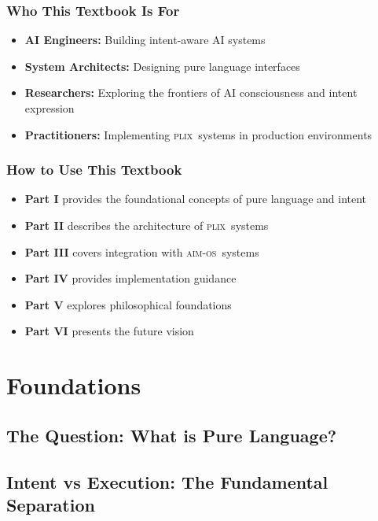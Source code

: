 \documentclass[11pt,a4paper,twoside]{book}
\newcommand{\plix}{\textsc{plix}}
\newcommand{\aimos}{\textsc{aim-os}}
\theoremstyle{definition}
\theoremstyle{remark}
\begin{document}
\section*{Who This Textbook Is For}

\begin{itemize}
    \item \textbf{AI Engineers:} Building intent-aware AI systems
    \item \textbf{System Architects:} Designing pure language interfaces
    \item \textbf{Researchers:} Exploring the frontiers of AI consciousness and intent expression
    \item \textbf{Practitioners:} Implementing \plix\ systems in production environments
\end{itemize}

\section*{How to Use This Textbook}

\begin{itemize}
    \item \textbf{Part I} provides the foundational concepts of pure language and intent
    \item \textbf{Part II} describes the architecture of \plix\ systems
    \item \textbf{Part III} covers integration with \aimos\ systems
    \item \textbf{Part IV} provides implementation guidance
    \item \textbf{Part V} explores philosophical foundations
    \item \textbf{Part VI} presents the future vision
\end{itemize}

\mainmatter

\part{Foundations}
\label{part:foundations}

\chapter{The Question: What is Pure Language?}
\label{ch:01}


\chapter{Intent vs Execution: The Fundamental Separation}
\label{ch:02}

\end{document}
